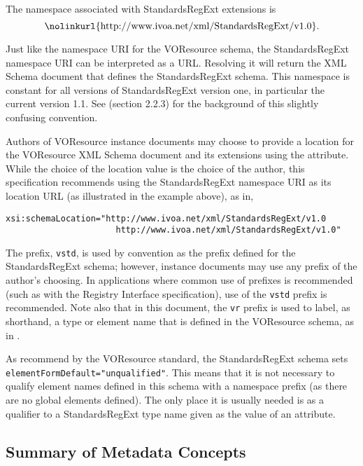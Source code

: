 \documentclass[11pt,a4paper]{ivoa}
\begin{document}
The namespace associated with StandardsRegExt extensions is
$$
\hbox{\nolinkurl{http://www.ivoa.net/xml/StandardsRegExt/v1.0}.}
$$

Just like the namespace URI for the VOResource schema, the
StandardsRegExt namespace URI can be interpreted as a URL.  Resolving it
will return the XML Schema document
that defines the StandardsRegExt schema.  This namespace is constant for
all versions of StandardsRegExt version one, in particular the current
version 1.1.  See \citet{2018ivoa.spec.0529H} (section 2.2.3) for the background of this
slightly confusing convention.

Authors of VOResource instance documents may choose to
provide a location for the VOResource XML Schema document and its
extensions using the
 attribute.  While the choice of
the location value is the choice of the author, this specification
recommends using the StandardsRegExt namespace URI as its location URL
(as illustrated in the example above), as in,



\begin{lstlisting}[basicstyle=\ttfamily\footnotesize]
xsi:schemaLocation="http://www.ivoa.net/xml/StandardsRegExt/v1.0
                      http://www.ivoa.net/xml/StandardsRegExt/v1.0"
\end{lstlisting}

The prefix, \texttt{vstd}, is used by convention as the
prefix defined for the StandardsRegExt schema; however, instance documents
may use any prefix of the author's choosing.  In applications where
common use of prefixes is recommended (such as with the Registry
Interface specification), use of the
\texttt{vstd} prefix is recommended.  Note also that in this
document, the \texttt{vr} prefix is used to label, as shorthand, a
type or element name that is defined in the VOResource schema, as in
.



As recommend by the VOResource standard, the
StandardsRegExt schema sets \verb|elementFormDefault="unqualified"|.
This means that it is not necessary to qualify element names defined
in this schema with a namespace prefix (as there are no global
elements defined).  The only place it is usually needed is as a
qualifier to a StandardsRegExt type name given as the value of an
 attribute.



\subsection{Summary of Metadata Concepts}
\end{document}

